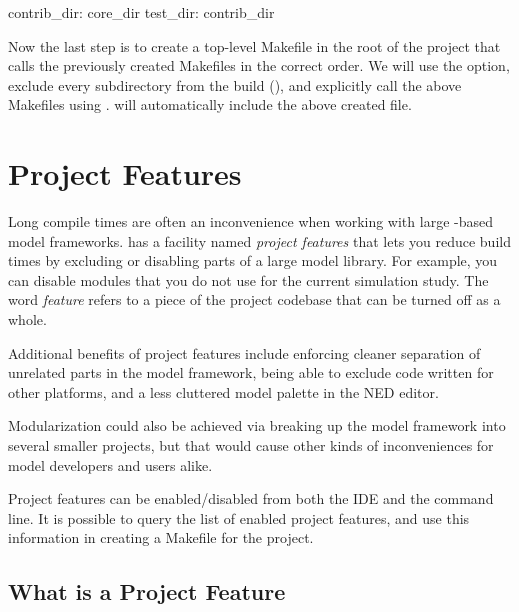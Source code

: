 \begin{filelisting}
contrib_dir: core_dir
test_dir: contrib_dir
\end{filelisting}

Now the last step is to create a top-level Makefile in the root of the project that
calls the previously created Makefiles in the correct order. We will use the
 option, exclude every subdirectory from the build (),
and explicitly call the above Makefiles using .
 will automatically include the above created  file.


\section{Project Features}
\label{sec:build-sim-progs:project-features}

Long compile times are often an inconvenience when working with large
{\opp}-based model frameworks. {\opp} has a facility named \textit{project
features} that lets you reduce build times by excluding or disabling parts
of a large model library. For example, you can disable modules that you do
not use for the current simulation study. The word \textit{feature} refers
to a piece of the project codebase that can be turned off as a whole.

Additional benefits of project features include enforcing cleaner
separation of unrelated parts in the model framework, being able to exclude
code written for other platforms, and a less cluttered model palette in the
NED editor.

\begin{note}
  Modularization could also be achieved via breaking up the model framework
  into several smaller projects, but that would cause other kinds of
  inconveniences for model developers and users alike.
\end{note}

Project features can be enabled/disabled from both the IDE and the command line.
It is possible to query the list of enabled project features, and use this
information in creating a Makefile for the project.


\subsection{What is a Project Feature}
\label{sec:build-sim-progs:project-feature}

